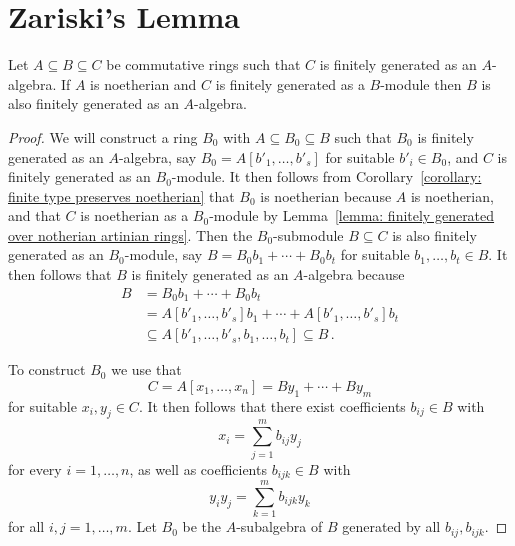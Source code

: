 \section{Zariski’s Lemma}
\label{subsection: Zariskis lemma}


\begin{lemma}
  \label{lemma: technical ring lemma}
  Let $A \subseteq B \subseteq C$ be commutative rings such that $C$ is finitely generated as an $A$-algebra.
  If  $A$ is noetherian and $C$ is finitely generated as a $B$-module then $B$ is also finitely generated as an $A$-algebra.
\end{lemma}


\begin{proof}
  We will construct a ring $B_0$ with $A \subseteq B_0 \subseteq B$ such that $B_0$ is finitely generated as an $A$-algebra, say $B_0 = A[b'_1, \dotsc, b'_s]$ for suitable $b'_i \in B_0$, and $C$ is finitely generated as an $B_0$-module.
  It then follows from Corollary~\ref{corollary: finite type preserves noetherian} that $B_0$ is noetherian because $A$ is noetherian, and that $C$ is noetherian as a $B_0$-module by Lemma~\ref{lemma: finitely generated over notherian artinian rings}.
  Then the $B_0$-submodule $B \subseteq C$ is also finitely generated as an $B_0$-module, say $B = B_0 b_1 + \dotsb + B_0 b_t$ for suitable $b_1, \dotsc, b_t \in B$.
  It then follows that $B$ is finitely generated as an $A$-algebra because
  \begin{align*}
                B
    &=          B_0 b_1 + \dotsb + B_0 b_t  \\
    &=          A[b'_1, \dotsc, b'_s] b_1 + \dotsb + A[b'_1, \dotsc, b'_s] b_t  \\
    &\subseteq  A[b'_1, \dotsc, b'_s, b_1, \dotsc, b_t]
     \subseteq  B \,.
  \end{align*}
  
  To construct $B_0$ we use that
  \[
      C
    = A[x_1, \dotsc, x_n]
    = B y_1 + \dotsb + B y_m
  \]
  for suitable $x_i, y_j \in C$.
  It then follows that there exist coefficients $b_{ij} \in B$ with
  \[
      x_i
    = \sum_{j=1}^m b_{ij} y_j
  \]
  for every $i = 1, \dotsc, n$, as well as coefficients $b_{ijk} \in B$ with
  \[
      y_i y_j
    = \sum_{k=1}^m b_{ijk} y_k
  \]
  for all $i,j = 1, \dotsc, m$.
  Let $B_0$ be the $A$-subalgebra of $B$ generated by all $b_{ij}, b_{ijk}$.
  

\end{proof}
